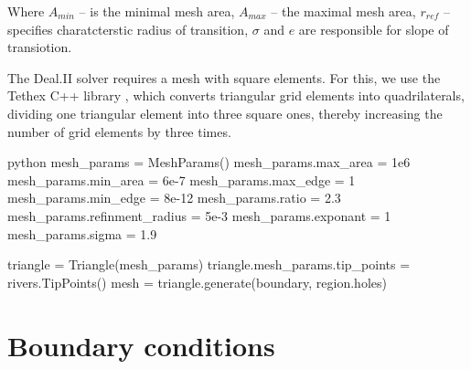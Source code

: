 \documentclass[]{pracamgr}
\begin{document}
      Where $A_{min}$ -- is the minimal mesh area, $A_{max}$ -- the maximal mesh area, $r_{ref}$ -- specifies charatcterstic radius of transition, $\sigma$ and $e$ are responsible for slope of transiotion.

      The Deal.II\cite{dealII94} solver requires a mesh with square elements. For this, we use the Tethex C++ library \cite{tethex} , which converts triangular grid elements into quadrilaterals, dividing one triangular element into three square ones, thereby increasing the number of grid elements by three times.

      \begin{mintedbox}{python}
        mesh_params = MeshParams()
        mesh_params.max_area = 1e6
        mesh_params.min_area = 6e-7
        mesh_params.max_edge = 1
        mesh_params.min_edge = 8e-12
        mesh_params.ratio = 2.3
        mesh_params.refinment_radius = 5e-3
        mesh_params.exponant = 1
        mesh_params.sigma = 1.9
      
        triangle = Triangle(mesh_params)
        triangle.mesh_params.tip_points = rivers.TipPoints()
        mesh = triangle.generate(boundary, region.holes)\end{mintedbox}

    \section{Boundary conditions}
\end{document}
